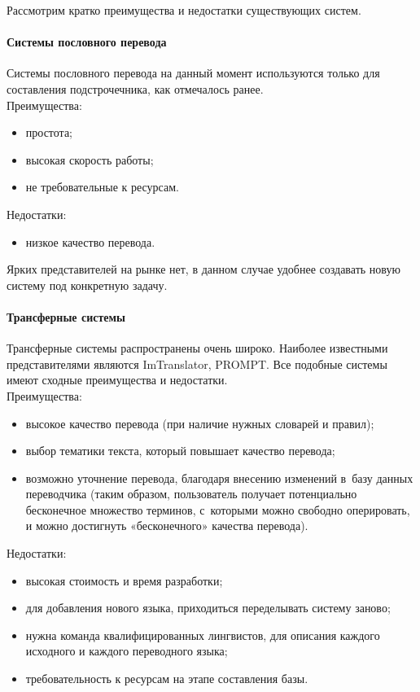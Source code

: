 Рассмотрим кратко преимущества и недостатки существующих систем. 
\paragraph{Системы пословного перевода}

Системы пословного перевода на данный момент используются 
только для составления подстрочечника, как отмечалось ранее. \\
Преимущества:
\begin{itemize}
	\item  простота;
	\item  высокая скорость работы;
	\item  не требовательные к ресурсам.
\end{itemize}
Недостатки: 
\begin{itemize}
	\item низкое качество перевода.
\end{itemize}
Ярких представителей на рынке нет, 
в данном случае удобнее создавать новую систему под конкретную задачу.

\paragraph{Трансферные системы}

Трансферные системы распространены очень широко. 
Наиболее известными представителями являются ImTranslator, PROMPT.
Все подобные системы имеют сходные преимущества и недостатки.\\
Преимущества:
\begin{itemize}
	\item  высокое качество перевода  (при наличие нужных словарей и правил);
	\item  выбор тематики текста, который повышает качество перевода;
	\item  возможно уточнение перевода, благодаря внесению изменений в~базу данных переводчика (таким образом, пользователь получает потенциально бесконечное множество терминов, с~которыми можно свободно оперировать, и можно достигнуть «бесконечного» качества перевода).
\end{itemize}
Недостатки: 
\begin{itemize}
	\item  высокая стоимость и время разработки;
	\item  для добавления нового языка, приходиться переделывать систему заново;
	\item  нужна команда квалифицированных лингвистов, для описания каждого исходного и каждого переводного языка;
	\item  требовательность к ресурсам на этапе составления базы.
\end{itemize}

